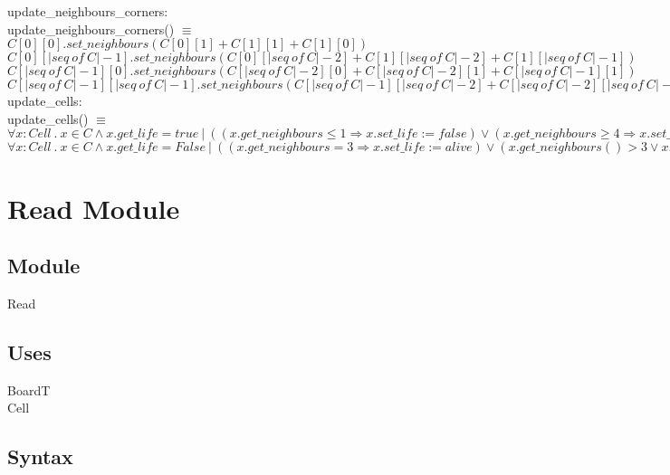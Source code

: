 \documentclass[12pt]{article}
\begin{document}
\noindent
update\_neighbours\_corners: \\
update\_neighbours\_corners() $\equiv$ \\
$C[0][0].set\_neighbours(C[0][1] + C[1][1] + C[1][0])$\\
$C[0][|seq \ of \ C|-1].set\_neighbours(C[0][|seq \ of \ C|-2] + C[1][|seq \ of \ C|-2] + C[1][|seq \ of \ C|-1])$\\
$C[|seq \ of \ C|-1][0].set\_neighbours(C[|seq \ of \ C|-2][0] + C[|seq \ of \ C|-2][1] + C[|seq \ of \ C|-1][1])$\\
$C[|seq \ of \ C|-1][|seq \ of \ C|-1].set\_neighbours(C[|seq \ of \ C|-1][|seq \ of \ C|-2] + C[|seq \ of \ C|-2][|seq \ of \ C|-2] + C[|seq \ of \ C|-2][|seq \ of \ C|-1])$\\

\noindent
update\_cells:\\
update\_cells() $\equiv$ \\
$\forall x : Cell \ . \ x \in C \land x.get\_life = true\ | \ ((x.get\_neighbours \leq 1 \Rightarrow x.set\_life := false) \lor 
(x.get\_neighbours \ge 4 \Rightarrow x.set\_life := false) \lor
(x.get\_neighbours > 1 \land x.get\_neighbours < 4 \Rightarrow x.set\_life := true))$ \\

$\forall x : Cell \ . \ x \in C \land x.get\_life = False \ | \ 
((x.get\_neighbours = 3 \Rightarrow x.set\_life := alive) \lor
(x.get\_neighbours() > 3 \lor x.get\_neighbours < 3 \Rightarrow x.set\_life() := false))$

\newpage

\section* {Read Module}

\subsection*{Module}

Read

\subsection* {Uses}

BoardT\\
Cell

\subsection* {Syntax}
\end{document}
